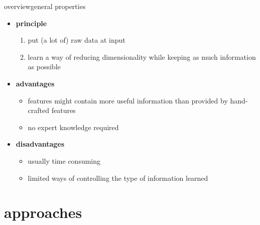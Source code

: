         \begin{frame}{overview}{general properties}
            \begin{itemize}
                \item   \textbf{principle}
                    \begin{enumerate}
                        \item   put (a lot of) raw data at input
                        \item   learn a way of reducing dimensionality while keeping as much information as possible
                    \end{enumerate}
                \bigskip
                \item<2->   \textbf{advantages}
                    \begin{itemize}
                        \item   features might contain more useful information than provided by hand-crafted features
                        \item   no expert knowledge required
                    \end{itemize}
                \smallskip
                \item<3->   \textbf{disadvantages}
                    \begin{itemize}
                        \item   usually time consuming
                        \item   limited ways of controlling the type of information learned
                    \end{itemize}
            \end{itemize}
		\end{frame}
    \section[approaches]{approaches}
        
